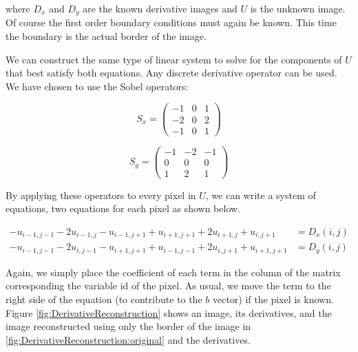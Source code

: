 \documentclass{InsightArticle}
\begin{document}
where $D_x$ and $D_y$ are the known derivative images and $U$ is the unknown image. Of course the first order boundary conditions must again be known. This time the boundary is the actual border of the image.

We can construct the same type of linear system to solve for the components of $U$ that best satisfy both equations. Any discrete derivative operator can be used. We have chosen to use the Sobel operators:

\begin{figure}[H]
  \begin{minipage}[b]{0.5\linewidth}
    \centering

    \begin{equation}
    S_x =
    \begin{pmatrix}
    -1 & 0 & 1 \\
    -2 & 0 & 2\\
    -1 & 0 & 1
    \end{pmatrix}
    \end{equation}

  \end{minipage}
    \hspace{0.5cm}
  \begin{minipage}[b]{0.5\linewidth}

    \begin{equation}
    S_y =
    \begin{pmatrix}
    -1 & -2 & -1 \\
    0 & 0 & 0\\
    1 & 2 & 1
    \end{pmatrix}
    \end{equation}

  \end{minipage}
\end{figure}

By applying these operators to every pixel in $U$, we can write a system of equations, two equations for each pixel as shown below.

\begin{align}
- u_{i-1,j-1} -2 u_{i-1,j} - u_{i-1,j+1} + u_{i+1,j+1} + 2 u_{i+1,j} + u_{i,j+1} &= D_x(i,j) \\
- u_{i-1,j-1} -2 u_{i,j-1} - u_{i+1,j+1} + u_{i-1,j-1} + 2 u_{i,j+1} + u_{i+1,j+1} &= D_y(i,j)
\end{align}

Again, we simply place the coefficient of each term in the column of the matrix corresponding the variable id of the pixel. As usual, we move the term to the right side of the equation (to contribute to the $b$ vector) if the pixel is known. Figure \ref{fig:DerivativeReconstruction} shows an image, its derivatives, and the image reconstructed using only the border of the image in \ref{fig:DerivativeReconstruction:original} and the derivatives.
\end{document}
